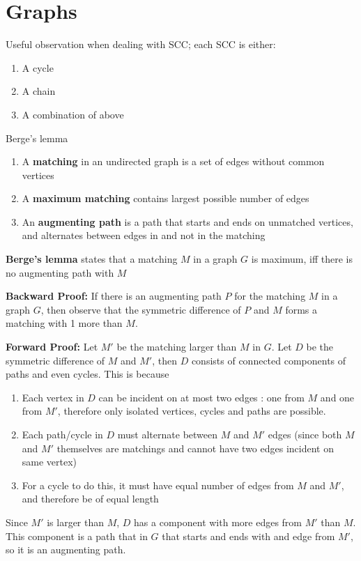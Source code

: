\documentclass[titlepage, 12pt]{book}
\begin{document}
\chapter{Graphs}

Useful observation when dealing with SCC; each SCC is either:
\begin{enumerate}
  \item A cycle
  \item A chain
  \item A combination of above
\end{enumerate}

\begin{theorem}{Berge's lemma}{}
    \begin{enumerate}
        \item A \textbf{matching} in an undirected graph is a set of edges without
            common vertices
        \item A \textbf{maximum matching} contains largest possible number of edges
        \item An \textbf{augmenting path} is a path that starts and ends on
            unmatched vertices, and alternates between edges in and not in the
            matching
    \end{enumerate}
    \textbf{Berge's lemma} states that a matching $M$ in a graph $G$ is maximum,
    iff there is no augmenting path with $M$
\end{theorem}
\textbf{Backward Proof:}
If there is an augmenting path $P$ for the matching $M$ in a graph $G$, then
observe that the symmetric difference of $P$ and $M$ forms a matching with 1
more than $M$.

\textbf{Forward Proof:}
Let $M'$ be the matching larger than $M$ in $G$. Let $D$ be the symmetric
difference of $M$ and $M'$, then $D$ consists of connected components of paths
and even cycles. This is because

\begin{enumerate}
    \item Each vertex in $D$ can be incident on at most two edges : one from $M$
        and one from $M'$, therefore only isolated vertices, cycles and paths
        are possible.
    \item Each path/cycle in $D$ must alternate between $M$ and $M'$ edges
        (since both $M$ and $M'$ themselves are matchings and cannot have two
        edges incident on same vertex)
    \item For a cycle to do this, it must have equal number of edges from $M$
        and $M'$, and therefore be of equal length
\end{enumerate}
Since $M'$ is larger than $M$, $D$ has a component with more edges from $M'$
than $M$. This component is a path that in $G$ that starts and ends with and
edge from $M'$, so it is an augmenting path.
\end{document}
